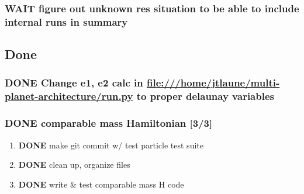 \documentclass[11pt]{article}
\begin{document}
\subsubsection{{\bfseries\sffamily WAIT} figure out unknown res situation to be able to include internal runs in summary}
\label{sec:org2f13058}
\subsection{Done}
\label{sec:org4e51ff8}
\subsubsection{{\bfseries\sffamily DONE} Change e1, e2 calc in \url{file:///home/jtlaune/multi-planet-architecture/run.py} to proper delaunay variables}
\label{sec:org5e9e12f}
\subsubsection{{\bfseries\sffamily DONE} comparable mass Hamiltonian [3/3]}
\label{sec:orgf22165e}
\begin{enumerate}
\item {\bfseries\sffamily DONE} make git commit w/ test particle test suite
\label{sec:org464df43}
\item {\bfseries\sffamily DONE} clean up, organize files
\label{sec:orgd5dd38d}
\item {\bfseries\sffamily DONE} write \& test comparable mass H code
\label{sec:orgdb3c34b}
\end{enumerate}
\end{document}
